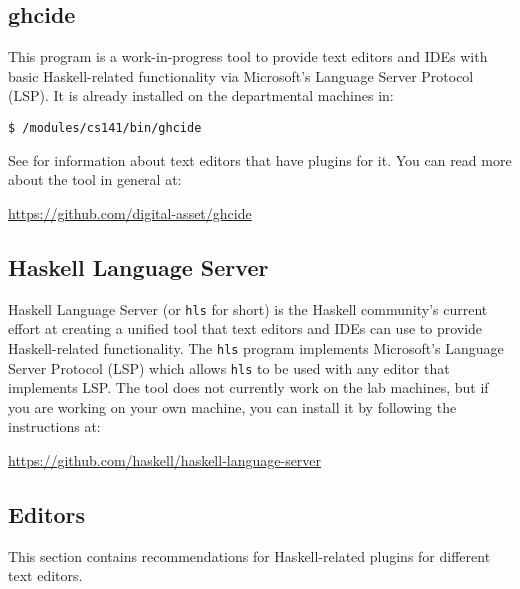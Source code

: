 \subsection{ghcide}

This program is a work-in-progress tool to provide text editors and IDEs with basic Haskell-related functionality via Microsoft's Language Server Protocol (LSP). It is already installed on the departmental machines in:
\begin{verbatim}
$ /modules/cs141/bin/ghcide
\end{verbatim}
See  for information about text editors that have plugins for it. You can read more about the tool in general at:
\begin{center}\small
	\url{https://github.com/digital-asset/ghcide}
\end{center}

\subsection{Haskell Language Server}

Haskell Language Server (or \texttt{\small hls} for short) is the Haskell community's current effort at creating a unified tool that text editors and IDEs can use to provide Haskell-related functionality. The \texttt{\small hls} program implements Microsoft's Language Server Protocol (LSP) which allows \texttt{\small hls} to be used with any editor that implements LSP. The tool does not currently work on the lab machines, but if you are working on your own machine, you can install it by following the instructions at:
\begin{center}\small
	\url{https://github.com/haskell/haskell-language-server}
\end{center}

\subsection{Editors}
\label{sec:editors}

This section contains recommendations for Haskell-related plugins for different text editors.

